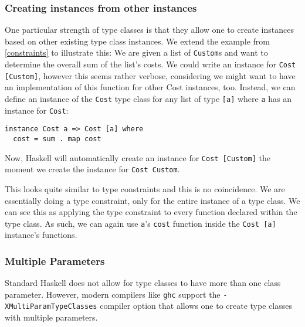 \subsubsection{Creating instances from other instances}

One particular strength of type classes is that they allow one to create instances based on other existing type class instances. We extend the example from \autoref{constraints} to illustrate this: We are given a list of \verb|Custom|s and want to determine the overall sum of the list's costs. We could write an instance for \verb|Cost [Custom]|, however this seems rather verbose, considering we might want to have an implementation of this function for other Cost instances, too. Instead, we can define an instance of the \verb|Cost| type class for any list of type \verb|[a]| where \verb|a| has an instance for \verb|Cost|:
\begin{verbatim}
instance Cost a => Cost [a] where
  cost = sum . map cost
\end{verbatim}
Now, Haskell will automatically create an instance for \verb|Cost [Custom]| the moment we create the instance for \verb|Cost Custom|.

This looks quite similar to type constraints and this is no coincidence. We are essentially doing a type constraint, only for the entire instance of a type class. We can see this as applying the type constraint to every function declared within the type class. As such, we can again use \verb|a|'s \verb|cost| function inside the \verb|Cost [a]| instance's functions.



\subsubsection{Multiple Parameters}\label{haskell-add}

Standard Haskell does not allow for type classes to have more than one class parameter. However, modern compilers like \verb|ghc| support the \verb|-XMultiParamTypeClasses| compiler option that allows one to create type classes with multiple parameters.

